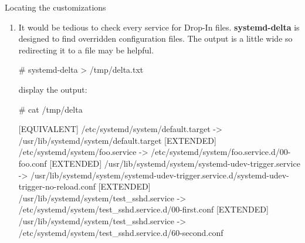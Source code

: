 \begin{Lab}
\begin{exe}{Locating the customizations}
\begin{enumerate}
	The output will show:
		\begin{itemize}
		\item service has a vendor default of "enabled" or "disabled"
		\item service has been manually "enabled" or "disabled"
		\item what the name and location of the vendor supplied config file
		\item the Drop-In directory and associated files
		\item limits and cgroup information 
		\item a few lines of the log associated with this service
		\end{itemize}
The output from the test system: 
		\begin{raw}
test_sshd.service - test
   Loaded: loaded (/usr/lib/systemd/system/test_sshd.service; disabled; vendor preset: disabled)
  Drop-In: /etc/systemd/system/test_sshd.service.d
           |-00-first.conf, 60-second.conf
   Active: active (running) since Wed 2019-08-14 08:44:50 CDT; 2s ago
 Main PID: 2629 (sshd)
    Tasks: 1 (limit: 3)
   Memory: 2.2M
   CGroup: /system.slice/test_sshd.service
           |-2629 /usr/sbin/sshd -D -oCiphers=aes256-gcm@openssh.com,chacha20-poly1305@openssh.com,aes256-ct>

Aug 14 08:44:50 rt.example.com systemd[1]: Starting test...
Aug 14 08:44:50 rt.example.com sshd[2629]: Server listening on 0.0.0.0 port 4242.
Aug 14 08:44:50 rt.example.com sshd[2629]: Server listening on :: port 4242.
Aug 14 08:44:50 rt.example.com systemd[1]: Started test.
		\end{raw}

		\item It would be tedious to check every service
			for Drop-In files. \textbf{systemd-delta} 
			is designed to find overridden configuration 
			files. The output is a little wide so 
			redirecting it to a file may be helpful. \\
			
			\begin{raw}
# systemd-delta > /tmp/delta.txt 
			\end{raw}

			display the output:
			\begin{rawscriptsize}
# cat /tmp/delta

[EQUIVALENT] /etc/systemd/system/default.target -> /usr/lib/systemd/system/default.target
[EXTENDED]   /etc/systemd/system/foo.service -> /etc/systemd/system/foo.service.d/00-foo.conf
[EXTENDED]   /usr/lib/systemd/system/systemd-udev-trigger.service -> 
				/usr/lib/systemd/system/systemd-udev-trigger.service.d/systemd-udev-trigger-no-reload.conf
[EXTENDED]   /usr/lib/systemd/system/test_sshd.service -> /etc/systemd/system/test_sshd.service.d/00-first.conf
[EXTENDED]   /usr/lib/systemd/system/test_sshd.service -> /etc/systemd/system/test_sshd.service.d/60-second.conf


\end{rawscriptsize}
\end{enumerate}
\end{exe}
\end{Lab}
